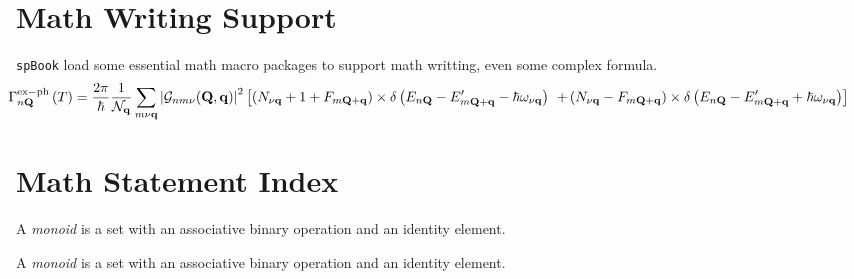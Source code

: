 
    \section{Math Writing Support}
        \texttt{spBook} load some essential math macro packages to support math writting, even some complex formula.
        \begin{equation}
            \hspace{-25pt}\Gamma_{n\mathbf{Q}}^{\mathrm{ex-ph}}\left(T\right)=\frac{2\pi}{\hbar}\frac{1}{\mathcal{N}_\mathbf{q}}\sum_{m\nu\mathbf{q}}\left|\mathcal{G}_{nm\nu}(\mathbf{Q},\mathbf{q})\right|^2\left[\left(N_{\nu\mathbf{q}}+1+F_{m\mathbf{Q}+\mathbf{q}}\right)\times\delta\left(E_{n\mathbf{Q}}-E^\prime_{m\mathbf{Q}+\mathbf{q}}-\hbar\omega_{\nu\mathbf{q}}\right)\right.
            \\
            \left.+\left(N_{\nu\mathbf{q}}-F_{m\mathbf{Q}+\mathbf{q}}\right)\times\delta\left(E_{n\mathbf{Q}}-E^\prime_{m\mathbf{Q}+\mathbf{q}}+\hbar\omega_{\nu\mathbf{q}}\right)\right]\nonumber
        \end{equation}

    \section{Math Statement Index}
        \begin{definition}[Monoid]
            A \emph{monoid} is a set with an associative binary operation and an identity element.
        \end{definition}
        \begin{theorem}[Schur]
            A \emph{monoid} is a set with an associative binary operation and an identity element.
        \end{theorem}